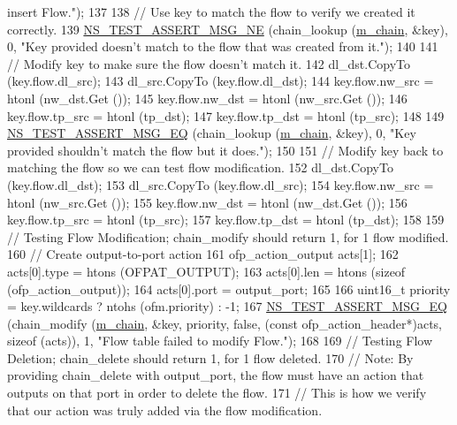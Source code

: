 \begin{DoxyCode}
{       insert Flow."});
137 
138   \textcolor{comment}{// Use key to match the flow to verify we created it correctly.}
139   \hyperlink{group__testing_ga73d66fb0050a5111453fd144e767b91a}{NS\_TEST\_ASSERT\_MSG\_NE} (chain\_lookup (\hyperlink{classSwitchFlowTableTestCase_a8f2e13cbf268c880500b1f2898b3558a}{m\_chain}, &key), 0, \textcolor{stringliteral}{"Key provided doesn't
       match to the flow that was created from it."});
140 
141   \textcolor{comment}{// Modify key to make sure the flow doesn't match it.}
142   dl\_dst.CopyTo (key.flow.dl\_src);
143   dl\_src.CopyTo (key.flow.dl\_dst);
144   key.flow.nw\_src = htonl (nw\_dst.Get ());
145   key.flow.nw\_dst = htonl (nw\_src.Get ());
146   key.flow.tp\_src = htonl (tp\_dst);
147   key.flow.tp\_dst = htonl (tp\_src);
148 
149   \hyperlink{group__testing_ga2a9d78cffb3db8e867c35fff0b698cf5}{NS\_TEST\_ASSERT\_MSG\_EQ} (chain\_lookup (\hyperlink{classSwitchFlowTableTestCase_a8f2e13cbf268c880500b1f2898b3558a}{m\_chain}, &key), 0, \textcolor{stringliteral}{"Key provided
       shouldn't match the flow but it does."});
150 
151   \textcolor{comment}{// Modify key back to matching the flow so we can test flow modification.}
152   dl\_dst.CopyTo (key.flow.dl\_dst);
153   dl\_src.CopyTo (key.flow.dl\_src);
154   key.flow.nw\_src = htonl (nw\_src.Get ());
155   key.flow.nw\_dst = htonl (nw\_dst.Get ());
156   key.flow.tp\_src = htonl (tp\_src);
157   key.flow.tp\_dst = htonl (tp\_dst);
158 
159   \textcolor{comment}{// Testing Flow Modification; chain\_modify should return 1, for 1 flow modified.}
160   \textcolor{comment}{// Create output-to-port action}
161   ofp\_action\_output acts[1];
162   acts[0].type = htons (OFPAT\_OUTPUT);
163   acts[0].len = htons (\textcolor{keyword}{sizeof} (ofp\_action\_output));
164   acts[0].port = output\_port;
165 
166   uint16\_t priority = key.wildcards ? ntohs (ofm.priority) : -1;
167   \hyperlink{group__testing_ga2a9d78cffb3db8e867c35fff0b698cf5}{NS\_TEST\_ASSERT\_MSG\_EQ} (chain\_modify (\hyperlink{classSwitchFlowTableTestCase_a8f2e13cbf268c880500b1f2898b3558a}{m\_chain}, &key, priority, \textcolor{keyword}{false}, (\textcolor{keyword}{const} 
      ofp\_action\_header*)acts, \textcolor{keyword}{sizeof} (acts)), 1, \textcolor{stringliteral}{"Flow table failed to modify Flow."});
168 
169   \textcolor{comment}{// Testing Flow Deletion; chain\_delete should return 1, for 1 flow deleted.}
170   \textcolor{comment}{// Note: By providing chain\_delete with output\_port, the flow must have an action that outputs on that
       port in order to delete the flow.}
171   \textcolor{comment}{// This is how we verify that our action was truly added via the flow modification.}

\end{DoxyCode}
